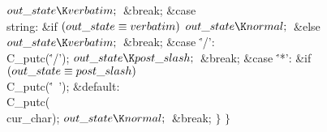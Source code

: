 ${}\\{out\_state}\K\\{verbatim};{}$\6
\&{break};\6
\4\&{case} \\{string}:\6
\&{if} ${}(\\{out\_state}\equiv\\{verbatim}){}$\1\5
${}\\{out\_state}\K\\{normal};{}$\2\6
\&{else}\1\5
${}\\{out\_state}\K\\{verbatim};{}$\2\6
\&{break};\6
\4\&{case} \.{'/'}:\5
\\{C\_putc}(\.{'/'});\6
${}\\{out\_state}\K\\{post\_slash};{}$\6
\&{break};\6
\4\&{case} \.{'*'}:\6
\&{if} ${}(\\{out\_state}\equiv\\{post\_slash}){}$\1\5
\\{C\_putc}(\.{'\ '});\2\6
\4\&{default}:\5
\\{C\_putc}(\\{cur\_char});\6
${}\\{out\_state}\K\\{normal};{}$\6
\&{break};\6
\4${}\}{}$\2\6
\4${}\}{}$\2\par
\fi

